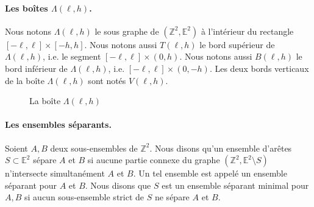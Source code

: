 \documentclass[titlepage,a4paper,12pt]{article}
\begin{document}
\paragraph{Les boîtes $\Lambda(\ell,h)$.} Nous notons $\Lambda(\ell,h)$ le sous graphe de $(\mathbb{Z}^2,\mathbb{E}^2)$ à l'intérieur du rectangle $[-\ell,\ell]\times[-h,h]$. Nous notons aussi $T(\ell,h)$ le bord supérieur de $\Lambda(\ell,h)$, i.e. le segment $[-\ell,\ell]\times(0,h)$. Nous notons aussi $B(\ell,h)$ le bord inférieur de $\Lambda(\ell,h)$, i.e. $[-\ell,\ell]\times(0,-h)$. Les deux bords verticaux de la boîte $\Lambda(\ell,h)$ sont notés $V(\ell,h)$.
\begin{figure}[h]
\center
{}
\caption{La boîte $\Lambda(\ell,h)$}
\end{figure}

\paragraph{Les ensembles séparants.} Soient $A,B$ deux sous-ensembles de $\mathbb{Z}^2$. Nous disons qu'un ensemble d'arêtes $S\subset \mathbb{E}^2$ sépare $A$ et $B$ si aucune partie connexe du graphe $(\mathbb{Z}^2,\mathbb{E}^2 \setminus S)$ n'intersecte simultanément $A$ et $B$. Un tel ensemble est appelé un ensemble séparant pour $A$ et $B$. Nous disons que $S$ est un ensemble séparant minimal pour $A,B$ si aucun sous-ensemble strict de $S$ ne sépare $A$ et $B$.
\end{document}
